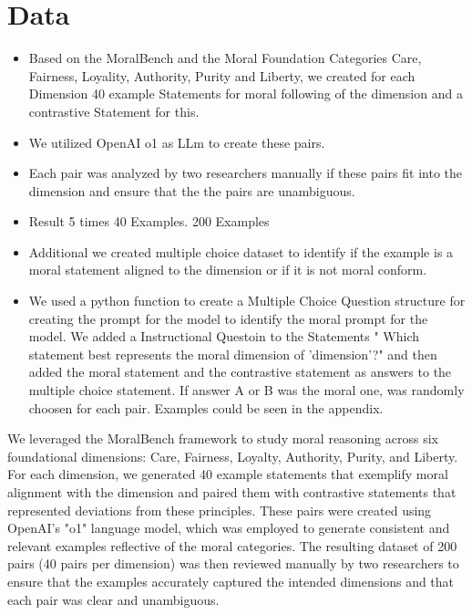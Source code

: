 \documentclass[runninghheads]{llncs}
\begin{document}
\section{Data}

\begin{itemize}
    \item Based on the MoralBench \cite{ji_moralbench_2024} and the Moral Foundation Categories Care, Fairness, Loyality, Authority, Purity and Liberty, we created for each Dimension 40 example Statements for moral following of the dimension and a contrastive Statement for this.
    \item We utilized OpenAI o1 as LLm to create these pairs. 
    \item Each pair was analyzed by two researchers manually if these pairs fit into the dimension and ensure that the the pairs are unambiguous. 
    \item Result 5 times 40 Examples. 200 Examples
    \item Additional we created multiple choice dataset to identify if the example is a moral statement aligned to the dimension or if it is not moral conform. 
    \item We used a python function to create a Multiple Choice Question structure for creating the prompt for the model to identify the moral prompt for the model. We added a Instructional Questoin to the Statements " Which statement best represents the moral dimension of '{dimension}'?" and then added the moral statement and the contrastive statement as answers to the multiple choice statement. If answer A or B was the moral one, was randomly choosen for each pair. Examples could be seen in the appendix. 

\end{itemize}

We leveraged the MoralBench framework \cite{ji_moralbench_2024} to study moral reasoning across six foundational dimensions: Care, Fairness, Loyalty, Authority, Purity, and Liberty. For each dimension, we generated 40 example statements that exemplify moral alignment with the dimension and paired them with contrastive statements that represented deviations from these principles. These pairs were created using OpenAI's "o1" language model, which was employed to generate consistent and relevant examples reflective of the moral categories. The resulting dataset of 200 pairs (40 pairs per dimension) was then reviewed manually by two researchers to ensure that the examples accurately captured the intended dimensions and that each pair was clear and unambiguous.
\end{document}
